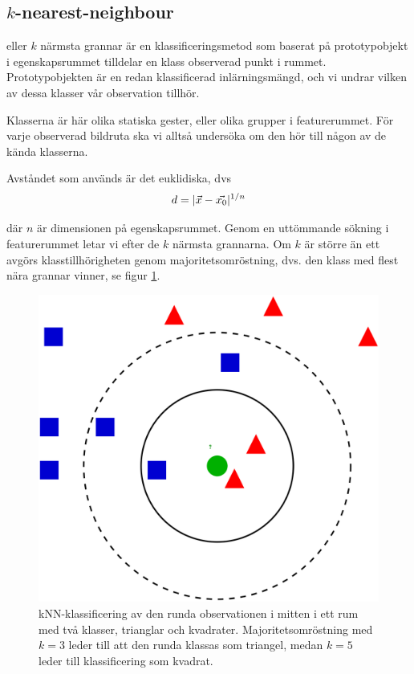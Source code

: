 \documentclass[../rapport_MVEX01-11-05]{subfiles}
\begin{document}
\subsection{$k$-nearest-neighbour}\label{sec:knn}

\knn eller $k$ närmsta grannar är en klassificeringsmetod som baserat på
prototypobjekt i egenskapsrummet tilldelar en klass observerad punkt i rummet.
Prototypobjekten är en redan klassificerad inlärningsmängd, och vi undrar vilken
av dessa klasser vår observation tillhör.

Klasserna är här olika statiska gester, eller olika grupper i featurerummet. För
varje observerad bildruta ska vi alltså undersöka om den hör till någon av de
kända klasserna.

Avståndet som används är det euklidiska, dvs
\begin{equation*}
    d = |\vec{x}-\vec{x_0}|^{1/n}
\end{equation*}

där $n$ är dimensionen på egenskapsrummet. Genom en uttömmande sökning i
featurerummet letar vi efter de $k$ närmsta grannarna. Om $k$ är större än ett
avgörs klasstillhörigheten genom majoritetsomröstning, dvs. den klass med flest
nära grannar vinner, se figur \ref{fig:knn-overview}.

\begin{figure}[!htb]
    \begin{center}
\includegraphics[width=0.75\columnwidth]{bilder/2000px-KnnClassification.png}
    \end{center}
    \caption{kNN-klassificering av den runda observationen i mitten i ett rum
    med två klasser, trianglar och kvadrater. Majoritetsomröstning
    med $k=3$ leder till att den runda klassas som triangel, medan $k=5$ leder
    till klassificering som kvadrat.}
    \label{fig:knn-overview}
\end{figure}
\end{document}
